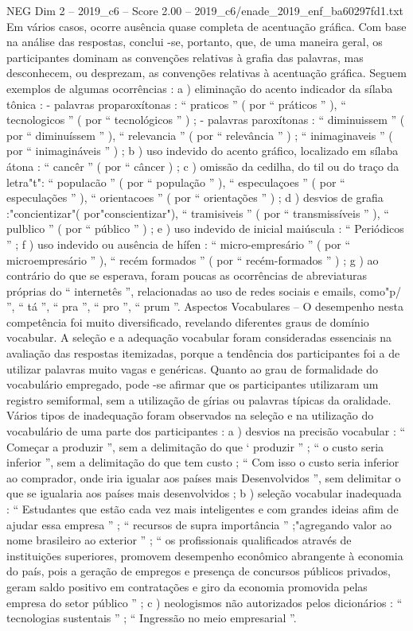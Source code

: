 \begin{textsample}{NEG Dim 2 – 2019\_c6 – Score 2.00 – 2019\_c6/enade\_2019\_enf\_ba60297fd1.txt}
Em vários casos, ocorre ausência quase completa de acentuação gráfica.
Com base na análise das respostas, conclui -se, portanto, que, de uma maneira geral, os participantes dominam as convenções relativas à grafia das palavras, mas desconhecem, ou desprezam, as convenções relativas à acentuação gráfica.
Seguem exemplos de algumas ocorrências : a ) eliminação do acento indicador da sílaba tônica : - palavras proparoxítonas : “ praticos ” ( por “ práticos ” ), “ tecnologicos ” ( por “ tecnológicos ” ) ; - palavras paroxítonas : “ diminuissem ” ( por “ diminuíssem ” ), “ relevancia ” ( por “ relevância ” ) ; “ inimaginaveis ” ( por “ inimagináveis ” ) ; b ) uso indevido do acento gráfico, localizado em sílaba átona : “ cancêr ” ( por “ câncer ) ; c ) omissão da cedilha, do til ou do traço da letra"t": “ populacão ” ( por “ população ” ), “ especulaçoes ” ( por “ especulações ” ), “ orientacoes ” ( por “ orientações ” ) ; d ) desvios de grafia :"concientizar"( por"conscientizar"), “ tramisiveis ” ( por “ transmissíveis ” ), “ pulblico ” ( por “ público ” ) ; e ) uso indevido de inicial maiúscula : “ Periódicos ” ; f ) uso indevido ou ausência de hífen : “ micro-empresário ” ( por “ microempresário ” ), “ recém formados ” ( por “ recém-formados ” ) ; g ) ao contrário do que se esperava, foram poucas as ocorrências de abreviaturas próprias do “ internetês ”, relacionadas ao uso de redes sociais e emails, como"p/ ”, “ tá ”, “ pra ”, “ pro ”, “ prum ”.
Aspectos Vocabulares – O desempenho nesta competência foi muito diversificado, revelando diferentes graus de domínio vocabular.
A seleção e a adequação vocabular foram consideradas essenciais na avaliação das respostas itemizadas, porque a tendência dos participantes foi a de utilizar palavras muito vagas e genéricas.
Quanto ao grau de formalidade do vocabulário empregado, pode -se afirmar que os participantes utilizaram um registro semiformal, sem a utilização de gírias ou palavras típicas da oralidade.
Vários tipos de inadequação foram observados na seleção e na utilização do vocabulário de uma parte dos participantes : a ) desvios na precisão vocabular : “ Começar a produzir ”, sem a delimitação do que ‘ produzir ” ; “ o custo seria inferior ”, sem a delimitação do que tem custo ; “ Com isso o custo seria inferior ao comprador, onde iria igualar aos países mais Desenvolvidos ”, sem delimitar o que se igualaria aos países mais desenvolvidos ; b ) seleção vocabular inadequada : “ Estudantes que estão cada vez mais inteligentes e com grandes ideias afim de ajudar essa empresa ” ; “ recursos de supra importância ” ;"agregando valor ao nome brasileiro ao exterior ” ; “ os profissionais qualificados através de instituições superiores, promovem desempenho econômico abrangente à economia do país, pois a geração de empregos e presença de concursos públicos privados, geram saldo positivo em contratações e giro da economia promovida pelas empresa do setor público ” ; c ) neologismos não autorizados pelos dicionários : “ tecnologias sustentais ” ; “ Ingressão no meio empresarial ”.

\end{textsample}
